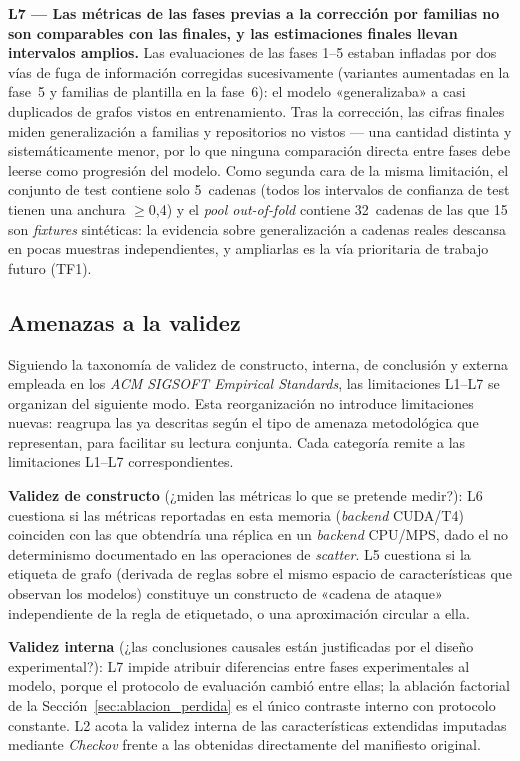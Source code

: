 \textbf{L7 — Las métricas de las fases previas a la corrección por familias no
son comparables con las finales, y las estimaciones finales llevan intervalos
amplios.} Las evaluaciones de las fases 1--5 estaban infladas por dos vías de
fuga de información corregidas sucesivamente (variantes aumentadas en la fase~5
y familias de plantilla en la fase~6): el modelo «generalizaba» a casi duplicados
de grafos vistos en entrenamiento. Tras la corrección, las cifras finales miden
generalización a familias y repositorios no vistos — una cantidad distinta y
sistemáticamente menor, por lo que ninguna comparación directa entre fases debe
leerse como progresión del modelo. Como segunda cara de la misma limitación, el
conjunto de test contiene solo 5~cadenas (todos los intervalos de confianza de
test tienen una anchura \(\geq\)0,4) y el \textit{pool out-of-fold} contiene
32~cadenas de las que 15 son \textit{fixtures} sintéticas: la evidencia sobre
generalización a cadenas reales descansa en pocas muestras independientes, y
ampliarlas es la vía prioritaria de trabajo futuro (TF1).

\subsection{Amenazas a la validez}
\label{sec:amenazas_validez}

Siguiendo la taxonomía de validez de constructo, interna, de conclusión y
externa empleada en los \textit{ACM SIGSOFT Empirical Standards}, las
limitaciones L1--L7 se organizan del siguiente modo. Esta reorganización no
introduce limitaciones nuevas: reagrupa las ya descritas según el tipo de
amenaza metodológica que representan, para facilitar su lectura conjunta. Cada
categoría remite a las limitaciones L1--L7 correspondientes.

\textbf{Validez de constructo} (¿miden las métricas lo que se pretende medir?):
L6 cuestiona si las métricas reportadas en esta memoria (\textit{backend} CUDA/T4)
coinciden con las que obtendría una réplica en un \textit{backend} CPU/MPS, dado el
no determinismo documentado en las operaciones de \textit{scatter}. L5 cuestiona si la etiqueta de grafo (derivada de reglas sobre
el mismo espacio de características que observan los modelos) constituye un
constructo de «cadena de ataque» independiente de la regla de etiquetado, o una
aproximación circular a ella.

\textbf{Validez interna} (¿las conclusiones causales están justificadas por el
diseño experimental?): L7 impide atribuir diferencias entre fases experimentales
al modelo, porque el protocolo de evaluación cambió entre ellas; la ablación
factorial de la Sección~\ref{sec:ablacion_perdida} es el único contraste interno
con protocolo constante. L2 acota la validez interna de las características
extendidas imputadas mediante \textit{Checkov} frente a las obtenidas
directamente del manifiesto original.


